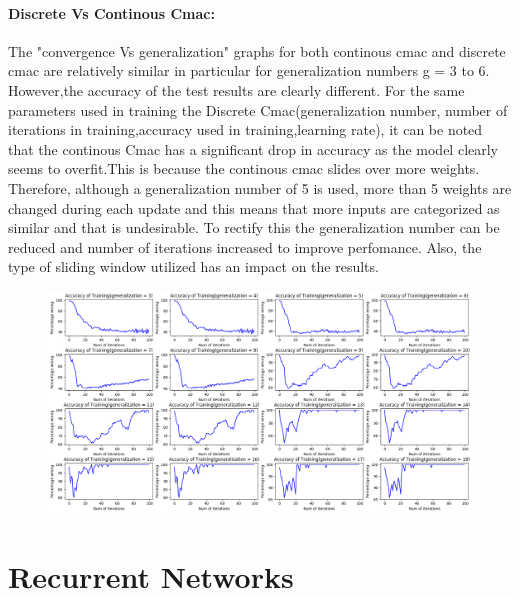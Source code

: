 \documentclass{article}
\begin{document}
  \paragraph{Discrete Vs Continous Cmac:}
  The "convergence Vs generalization" graphs for both continous cmac and discrete cmac are relatively similar in particular for generalization numbers g = 3 to 6. However,the accuracy of the test results  are clearly different.
  For the same parameters used in training the Discrete Cmac(generalization number, number of iterations in training,accuracy used in training,learning rate), it can be noted that the continous Cmac has a significant drop in accuracy as the model clearly seems to overfit.This is because the continous cmac slides over more weights. Therefore, although a generalization number of 5 is used, more than 5 weights are changed during each update and this means that more inputs are categorized as similar and that is undesirable. To rectify this the generalization number can be reduced and number of iterations increased to improve perfomance. Also, the type of sliding window utilized has an impact on the results.  
  \begin{figure}[h!]
    \includegraphics[scale=0.35]{./Results/convergenceVsgeneralizationC.png}
  \end{figure}
\newpage
\section{Recurrent Networks}
\end{document}
